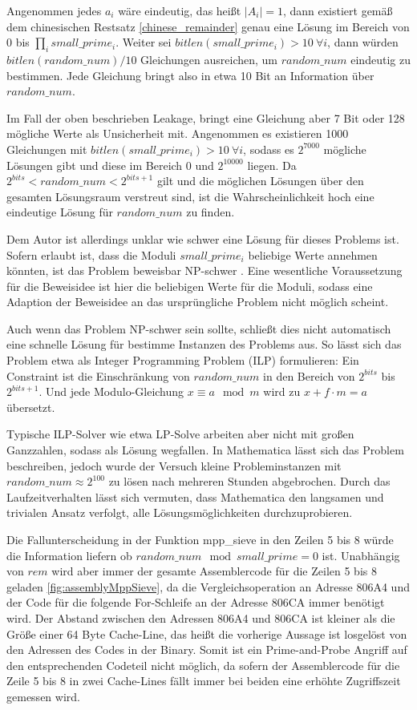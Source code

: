 Angenommen jedes $a_i$ wäre eindeutig, das heißt $|A_i|=1$, dann existiert gemäß dem chinesischen Restsatz \ref{chinese_remainder} genau eine Lösung im Bereich von $0$ bis $\prod_i small\_prime_i$.
Weiter sei $bitlen(small\_prime_i) > 10 \: \forall i$, dann würden $bitlen(random\_num)/10$ Gleichungen ausreichen, um $random\_num$ eindeutig zu bestimmen.
Jede Gleichung bringt also in etwa 10 Bit an Information über $random\_num$.

Im Fall der oben beschrieben Leakage, bringt eine Gleichung aber 7 Bit oder 128 mögliche Werte als Unsicherheit mit.
Angenommen es existieren 1000 Gleichungen mit $bitlen(small\_prime_i) > 10 \: \forall i$, sodass es $2^{7000}$ mögliche Lösungen gibt und diese im Bereich 0 und $2^{10000}$ liegen.
Da $2^{bits} < random\_num < 2^{bits+1}$ gilt und die möglichen Lösungen über den gesamten Lösungsraum verstreut sind, ist die Wahrscheinlichkeit hoch eine eindeutige Lösung für $random\_num$ zu finden.

Dem Autor ist allerdings unklar wie schwer eine Lösung für dieses Problems ist.
Sofern erlaubt ist, dass die Moduli $small\_prime_i$ beliebige Werte annehmen könnten, ist das Problem beweisbar NP-schwer \cite{FuzzyCRTProof}.
Eine wesentliche Voraussetzung für die Beweisidee ist hier die beliebigen Werte für die Moduli, sodass eine Adaption der Beweisidee an das ursprüngliche Problem nicht möglich scheint. 

Auch wenn das Problem NP-schwer sein sollte, schließt dies nicht automatisch eine schnelle Lösung für bestimme Instanzen des Problems aus.
So lässt sich das Problem etwa als Integer Programming Problem (ILP) formulieren:
Ein Constraint ist die Einschränkung von $random\_num$ in den Bereich von $2^{bits}$ bis $2^{bits+1}$.
Und jede Modulo-Gleichung $x \equiv a \mod m$ wird zu $x + f \cdot m = a$ übersetzt.

Typische ILP-Solver wie etwa LP-Solve arbeiten aber nicht mit großen Ganzzahlen, sodass  als Lösung wegfallen.
In Mathematica lässt sich das Problem beschreiben, jedoch wurde der Versuch kleine Probleminstanzen mit $random\_num \approx 2^100$ zu lösen nach mehreren Stunden abgebrochen.
Durch das Laufzeitverhalten lässt sich vermuten, dass Mathematica den langsamen und trivialen Ansatz verfolgt, alle Lösungsmöglichkeiten durchzuprobieren.

Die Fallunterscheidung in der Funktion mpp_sieve in den Zeilen 5 bis 8 würde die Information liefern ob $random\_num \mod small\_prime = 0$ ist.
Unabhängig von $rem$ wird aber immer der gesamte Assemblercode für die Zeilen 5 bis 8 geladen \ref{fig:assemblyMppSieve}, da die Vergleichsoperation an Adresse 806A4 und der Code für die folgende For-Schleife an der Adresse 806CA immer benötigt wird.
Der Abstand zwischen den Adressen 806A4 und 806CA ist kleiner als die Größe einer 64 Byte Cache-Line, das heißt die vorherige Aussage ist losgelöst von den Adressen des Codes in der Binary.
Somit ist ein Prime-and-Probe Angriff auf den entsprechenden Codeteil nicht möglich, da sofern der Assemblercode für die Zeile 5 bis 8 in zwei Cache-Lines fällt immer bei beiden eine erhöhte Zugriffszeit gemessen wird.

